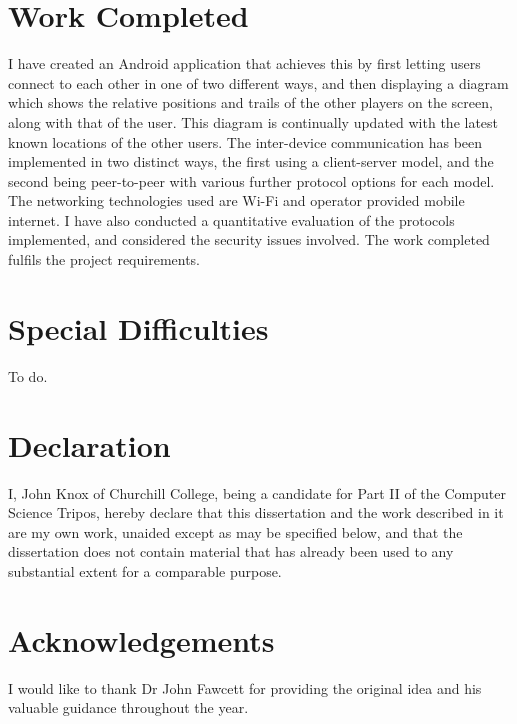 \section*{Work Completed}

I have created an Android application that achieves this by first letting users connect to each other in one of two different ways, and then displaying a diagram which shows the relative positions and trails of the other players on the screen, along with that of the user. This diagram is continually updated with the latest known locations of the other users. The inter-device communication has been implemented in two distinct ways, the first using a client-server model, and the second being peer-to-peer with various further protocol options for each model.
The networking technologies used are Wi-Fi and operator provided mobile internet.
I have also conducted a quantitative evaluation of the protocols implemented, and considered the security issues involved.
The work completed fulfils the project requirements.

\section*{Special Difficulties}

To do.
 
\newpage
\section*{Declaration}

I, John Knox of Churchill College, being a candidate for Part II of the Computer
Science Tripos, hereby declare
that this dissertation and the work described in it are my own work,
unaided except as may be specified below, and that the dissertation
does not contain material that has already been used to any substantial
extent for a comparable purpose.

\bigskip
{}

\medskip
{}

\cleardoublepage

\tableofcontents


\newpage
\section*{Acknowledgements}

I would like to thank Dr John Fawcett for providing the original idea and his valuable guidance throughout the year.


